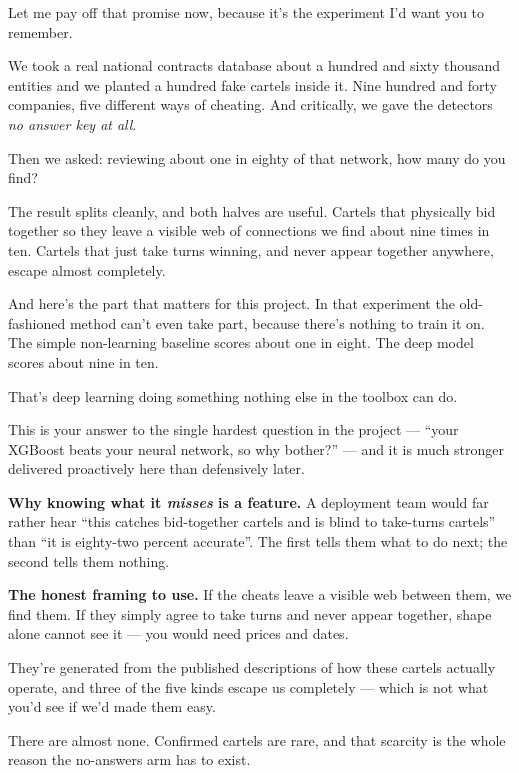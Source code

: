 \documentclass[11pt]{article}
\begin{document}

\begin{saythis}
Let me pay off that promise now, because it's the experiment I'd want you to
remember.

We took a real national contracts database \bt about a hundred and sixty
thousand entities \bt and we planted a hundred fake cartels inside it. Nine
hundred and forty companies, five different ways of cheating. And critically,
we gave the detectors \emph{no answer key at all}.

Then we asked: reviewing about one in eighty of that network, how many do you
find?

The result splits cleanly, and both halves are useful. Cartels that physically
bid together \bt so they leave a visible web of connections \bt we find about
nine times in ten. Cartels that just take turns winning, and never appear
together anywhere, escape almost completely.

And here's the part that matters for this project. In that experiment the
old-fashioned method can't even take part, because there's nothing to train it
on. The simple non-learning baseline scores about one in eight. The deep model
scores about nine in ten.

That's deep learning doing something nothing else in the toolbox can do.
\end{saythis}

\begin{means}
This is your answer to the single hardest question in the project --- ``your
XGBoost beats your neural network, so why bother?'' --- and it is much stronger
delivered proactively here than defensively later.

\textbf{Why knowing what it \emph{misses} is a feature.} A deployment team
would far rather hear ``this catches bid-together cartels and is blind to
take-turns cartels'' than ``it is eighty-two percent accurate''. The first
tells them what to do next; the second tells them nothing.

\textbf{The honest framing to use.} If the cheats leave a visible web between
them, we find them. If they simply agree to take turns and never appear
together, shape alone cannot see it --- you would need prices and dates.
\end{means}

\begin{asked}
 They're generated from the
published descriptions of how these cartels actually operate, and three of the
five kinds escape us completely --- which is not what you'd see if we'd made
them easy.

 There are almost none. Confirmed
cartels are rare, and that scarcity is the whole reason the no-answers arm has
to exist.
\end{asked}
\end{document}
